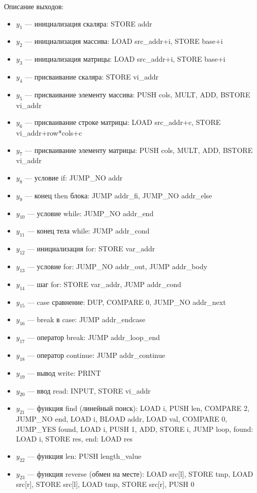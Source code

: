 \documentclass[a4paper,final]{article}
\begin{document}
Описание выходов:
\begin{itemize}
    \item $y_1$ --- инициализация скаляра: STORE addr
    \item $y_2$ --- инициализация массива: LOAD src\_addr+i, STORE base+i
    \item $y_3$ --- инициализация матрицы: LOAD src\_addr+i, STORE base+i
    \item $y_4$ --- присваивание скаляра: STORE vi\_addr
    \item $y_5$ --- присваивание элементу массива: PUSH cols, MULT, ADD, BSTORE vi\_addr
    \item $y_6$ --- присваивание строке матрицы: LOAD src\_addr+c, STORE vi\_addr+row*cols+c
    \item $y_7$ --- присваивание элементу матрицы: PUSH cols, MULT, ADD, BSTORE vi\_addr
    \item $y_8$ --- условие if: JUMP\_NO addr
    \item $y_9$ --- конец then блока: JUMP addr\_fi, JUMP\_NO addr\_else
    \item $y_{10}$ --- условие while: JUMP\_NO addr\_end
    \item $y_{11}$ --- конец тела while: JUMP addr\_cond
    \item $y_{12}$ --- инициализация for: STORE var\_addr
    \item $y_{13}$ --- условие for: JUMP\_NO addr\_out, JUMP addr\_body
    \item $y_{14}$ --- шаг for: STORE var\_addr, JUMP addr\_cond
    \item $y_{15}$ --- case сравнение: DUP, COMPARE 0, JUMP\_NO addr\_next
    \item $y_{16}$ --- break в case: JUMP addr\_endcase
    \item $y_{17}$ --- оператор break: JUMP addr\_loop\_end
    \item $y_{18}$ --- оператор continue: JUMP addr\_continue
    \item $y_{19}$ --- вывод write: PRINT
    \item $y_{20}$ --- ввод read: INPUT, STORE vi\_addr
    \item $y_{21}$ --- функция find (линейный поиск): LOAD i, PUSH len, COMPARE 2, JUMP\_NO end, LOAD i, BLOAD addr, LOAD val, COMPARE 0, JUMP\_YES found, LOAD i, PUSH 1, ADD, STORE i, JUMP loop, found: LOAD i, STORE res, end: LOAD res
    \item $y_{22}$ --- функция len: PUSH length\_value
    \item $y_{23}$ --- функция reverse (обмен на месте): LOAD src[l], STORE tmp, LOAD src[r], STORE src[l], LOAD tmp, STORE src[r], PUSH 0

\end{itemize}
\end{document}
